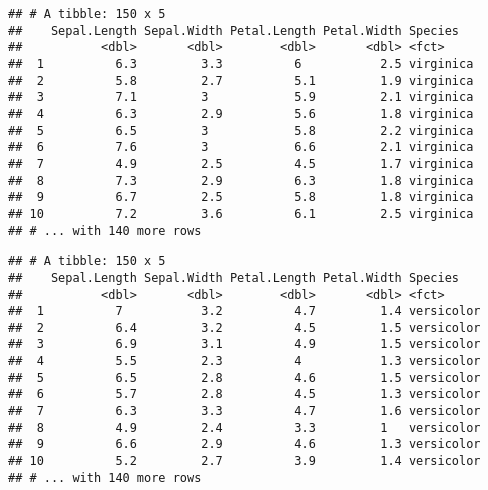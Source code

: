 \documentclass[]{book}
\newenvironment{Shaded}{\begin{snugshade}}{\end{snugshade}}
\newcommand{\DataTypeTok}[1]{\textcolor[rgb]{0.13,0.29,0.53}{#1}}
\newcommand{\KeywordTok}[1]{\textcolor[rgb]{0.13,0.29,0.53}{\textbf{#1}}}
\newcommand{\NormalTok}[1]{#1}
\newcommand{\OperatorTok}[1]{\textcolor[rgb]{0.81,0.36,0.00}{\textbf{#1}}}
\newcommand{\StringTok}[1]{\textcolor[rgb]{0.31,0.60,0.02}{#1}}
\begin{document}
\begin{Shaded}
\end{Shaded}

\begin{verbatim}
## # A tibble: 150 x 5
##    Sepal.Length Sepal.Width Petal.Length Petal.Width Species  
##           <dbl>       <dbl>        <dbl>       <dbl> <fct>    
##  1          6.3         3.3          6           2.5 virginica
##  2          5.8         2.7          5.1         1.9 virginica
##  3          7.1         3            5.9         2.1 virginica
##  4          6.3         2.9          5.6         1.8 virginica
##  5          6.5         3            5.8         2.2 virginica
##  6          7.6         3            6.6         2.1 virginica
##  7          4.9         2.5          4.5         1.7 virginica
##  8          7.3         2.9          6.3         1.8 virginica
##  9          6.7         2.5          5.8         1.8 virginica
## 10          7.2         3.6          6.1         2.5 virginica
## # ... with 140 more rows
\end{verbatim}

\begin{Shaded}
\end{Shaded}

\begin{verbatim}
## # A tibble: 150 x 5
##    Sepal.Length Sepal.Width Petal.Length Petal.Width Species   
##           <dbl>       <dbl>        <dbl>       <dbl> <fct>     
##  1          7           3.2          4.7         1.4 versicolor
##  2          6.4         3.2          4.5         1.5 versicolor
##  3          6.9         3.1          4.9         1.5 versicolor
##  4          5.5         2.3          4           1.3 versicolor
##  5          6.5         2.8          4.6         1.5 versicolor
##  6          5.7         2.8          4.5         1.3 versicolor
##  7          6.3         3.3          4.7         1.6 versicolor
##  8          4.9         2.4          3.3         1   versicolor
##  9          6.6         2.9          4.6         1.3 versicolor
## 10          5.2         2.7          3.9         1.4 versicolor
## # ... with 140 more rows
\end{verbatim}
\end{document}
